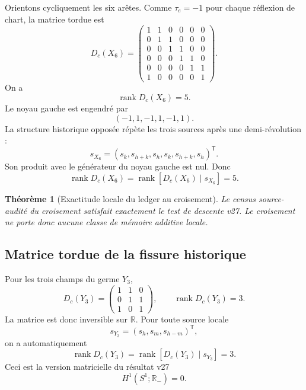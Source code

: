 \documentclass[11pt,a4paper]{article}
\newtheorem{theorem}{Théorème}[section]
\newcommand{\rank}{\operatorname{rank}}
\begin{document}
Orientons cycliquement les six arêtes. Comme $\tau_e=-1$ pour chaque réflexion de chart, la matrice tordue est
\begin{equation}\label{eq:v28-D6}
 D_c(X_6)
 =
 \begin{pmatrix}
 1&1&0&0&0&0\\
 0&1&1&0&0&0\\
 0&0&1&1&0&0\\
 0&0&0&1&1&0\\
 0&0&0&0&1&1\\
 1&0&0&0&0&1
 \end{pmatrix}.
\end{equation}
On a
\[
 \boxed{\rank D_c(X_6)=5.}
\]
Le noyau gauche est engendré par
\[
 (-1,1,-1,1,-1,1).
\]
La structure historique opposée répète les trois sources après une demi-révolution :
\begin{equation}\label{eq:v28-s6}
 s_{X_6}
 =
 (s_k,s_{h+k},s_h,s_k,s_{h+k},s_h)^{\mathsf T}.
\end{equation}
Son produit avec le générateur du noyau gauche est nul. Donc
\begin{equation}\label{eq:v28-X6-rank}
 \boxed{
 \rank D_c(X_6)
 =
 \rank[D_c(X_6)\mid s_{X_6}]
 =5.}
\end{equation}

\begin{theorem}[Exactitude locale du ledger au croisement]\label{thm:v28-X6-exact}
Le census source-audité du croisement satisfait exactement le test de descente v27. Le croisement ne porte donc aucune classe de mémoire additive locale.
\end{theorem}

\subsection{Matrice tordue de la fissure historique}

Pour les trois champs du germe $Y_3$,
\begin{equation}\label{eq:v28-D3}
 D_c(Y_3)
 =
 \begin{pmatrix}
 1&1&0\\
 0&1&1\\
 1&0&1
 \end{pmatrix},
 \qquad
 \boxed{\rank D_c(Y_3)=3.}
\end{equation}
La matrice est donc inversible sur $\mathbb R$. Pour toute source locale
\[
 s_{Y_3}=(s_h,s_m,s_{h-m})^{\mathsf T},
\]
on a automatiquement
\begin{equation}\label{eq:v28-Y3-rank}
 \boxed{
 \rank D_c(Y_3)
 =
 \rank[D_c(Y_3)\mid s_{Y_3}]
 =3.}
\end{equation}
Ceci est la version matricielle du résultat v27
\[
 H^1(S^1;\mathbb R_-)=0.
\]
\end{document}
